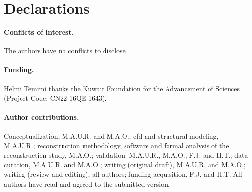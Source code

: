 \documentclass[12pt,a4paper]{article}
\newcommand{\CFD}{\ac{cfd}\xspace}
\theoremstyle{definition}
\numberwithin{equation}{section}
\newif\ifanonymized
\providecommand{\DIFdeltex}[1]{{\protect\color{red} \scriptsize #1}} %
\providecommand{\DIFdelbegin}{} %
\providecommand{\DIFdelend}{} %
\providecommand{\DIFdel}[1]{\texorpdfstring{\DIFdeltex{#1}}{}} %
\newcommand{\DIFscaledelfig}{0.5}
\newlength{\DIFdelgraphicswidth} %
\newlength{\DIFdelgraphicsheight} %
\newcommand{\DIFdelincludegraphics}[2][]{%
\sbox{\DIFdelgraphicsbox}{\DIFOincludegraphics[#1]{#2}}%
\settoboxwidth{\DIFdelgraphicswidth}{\DIFdelgraphicsbox} %
\settoboxtotalheight{\DIFdelgraphicsheight}{\DIFdelgraphicsbox} %
\scalebox{\DIFscaledelfig}{%
\parbox[b]{\DIFdelgraphicswidth}{\usebox{\DIFdelgraphicsbox}\\[-\baselineskip] \rule{\DIFdelgraphicswidth}{0em}}\llap{\resizebox{\DIFdelgraphicswidth}{\DIFdelgraphicsheight}{%
\setlength{\unitlength}{\DIFdelgraphicswidth}%
\begin{picture}(1,1)%
\thicklines\linethickness{2pt} %
{\color[rgb]{1,0,0}\put(0,0){\framebox(1,1){}}}%
{\color[rgb]{1,0,0}\put(0,0){\line( 1,1){1}}}%
{\color[rgb]{1,0,0}\put(0,1){\line(1,-1){1}}}%
\end{picture}%
}\hspace*{3pt}}} %
} %
\DeclareRobustCommand{\DIFdelbegin}{\DIFOdelbegin \let\includegraphics\DIFdelincludegraphics} %
\DeclareRobustCommand{\DIFdelend}{\DIFOaddend \let\includegraphics\DIFOincludegraphics} %
\renewcommand{\DIFdeltex}[1]{}
\renewcommand{\DIFdel}[1]{}
\renewcommand{\DIFdelincludegraphics}[2][]{}
\def\DIFdelbegin{}\def\DIFdelend{}%
\begin{document}
\section*{Declarations}
\paragraph{Conflicts of interest.} The authors have no conflicts to disclose.

\ifanonymized
\paragraph{Funding and author contributions.} Removed for anonymized review.
\else
\paragraph{Funding.} Helmi Temimi thanks the Kuwait Foundation for the Advancement of Sciences (Project Code: CN22-16QE-1643).

\paragraph{Author contributions.} Conceptualization, M.A.U.R. and M.A.O.; \CFD and structural modeling, M.A.U.R.; reconstruction methodology, software and formal analysis of the reconstruction study, M.A.O.; validation, M.A.U.R., M.A.O., F.J. and H.T.; data curation, M.A.U.R. and M.A.O.; writing (original draft), M.A.U.R. and M.A.O.; writing (review and editing), all authors; funding acquisition, F.J. and H.T. All authors have read and agreed to the submitted version.
\fi


\DIFdelbegin %

\paragraph{\DIFdel{Data availability statement.}} %
\addtocounter{paragraph}{-1}%
\DIFdel{The }%
\DIFdel{exports analyzed in this study are available from the corresponding author on reasonable request.  The reconstruction code and configuration files are available in a public repository whose link is withheld for anonymized review. The reconstruction code and configuration files are available at }%
\DIFdel{.}%
\DIFdelend 
\end{document}
